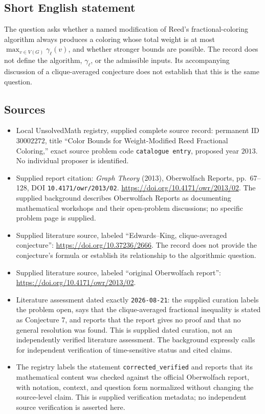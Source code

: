 \documentclass[11pt]{article}
\begin{document}
\subsection{Short English statement}
The question asks whether a named modification of Reed's fractional-coloring algorithm always produces a coloring whose total weight is at most \(\max_{v\in V(G)}\gamma_\ell(v)\), and whether stronger bounds are possible. The record does not define the algorithm, \(\gamma_\ell\), or the admissible inputs. Its accompanying discussion of a clique-averaged conjecture does not establish that this is the same question.
\subsection{Sources}
\begin{itemize}
\item Local UnsolvedMath registry, supplied complete source record: permanent ID \(30002272\), title ``Color Bounds for Weight-Modified Reed Fractional Coloring,'' exact source problem code \texttt{catalogue entry}, proposed year \(2013\). No individual proposer is identified.
\item Supplied report citation: \emph{Graph Theory} (2013), Oberwolfach Reports, pp.\ 67--128, DOI \texttt{10.4171/owr/2013/02}. \url{https://doi.org/10.4171/owr/2013/02}. The supplied background describes Oberwolfach Reports as documenting mathematical workshops and their open-problem discussions; no specific problem page is supplied.
\item Supplied literature source, labeled ``Edwards--King, clique-averaged conjecture'': \url{https://doi.org/10.37236/2666}. The record does not provide the conjecture's formula or establish its relationship to the algorithmic question.
\item Supplied literature source, labeled ``original Oberwolfach report'': \url{https://doi.org/10.4171/owr/2013/02}.
\item Literature assessment dated exactly \texttt{2026-08-21}: the supplied curation labels the problem open, says that the clique-averaged fractional inequality is stated as Conjecture 7, and reports that the report gives no proof and that no general resolution was found. This is supplied dated curation, not an independently verified literature assessment. The background expressly calls for independent verification of time-sensitive status and cited claims.
\item The registry labels the statement \texttt{corrected\_verified} and reports that its mathematical content was checked against the official Oberwolfach report, with notation, context, and question form normalized without changing the source-level claim. This is supplied verification metadata; no independent source verification is asserted here.
\end{itemize}
\end{document}
